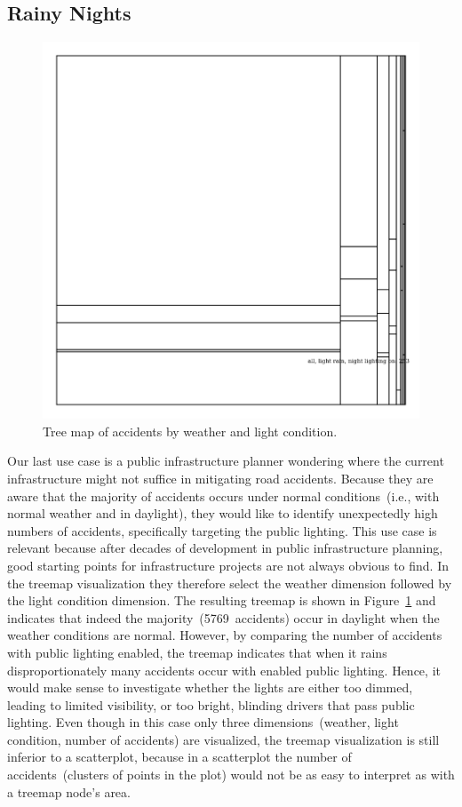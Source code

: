 \subsection{Rainy Nights}
\begin{figure}
    \centering
    \includegraphics[width=0.6\linewidth]{figures/tree-treemap-weather-light-condition}
    \caption{Tree map of accidents by weather and light condition.}
    \label{figure-treemap-weather-light-condition}
\end{figure}
Our last use case is a public infrastructure planner wondering where the current infrastructure might not suffice in mitigating road accidents. Because they are aware that the majority of accidents occurs under normal conditions~(i.e., with normal weather and in daylight), they would like to identify unexpectedly high numbers of accidents, specifically targeting the public lighting.
This use case is relevant because after decades of development in public infrastructure planning, good starting points for infrastructure projects are not always obvious to find. 
In the treemap visualization they therefore select the weather dimension followed by the light condition dimension.
The resulting treemap is shown in Figure~\ref{figure-treemap-weather-light-condition} and indicates that indeed the majority~(5769~accidents) occur in daylight when the weather conditions are normal.
However, by comparing the number of accidents with public lighting enabled, the treemap indicates that when it rains disproportionately many accidents occur with enabled public lighting. Hence, it would make sense to investigate whether the lights are either too dimmed, leading to limited visibility, or too bright, blinding drivers that pass public lighting.
Even though in this case only three dimensions~(weather, light condition, number of accidents) are visualized, the treemap visualization is still inferior to a scatterplot, because in a scatterplot the number of accidents~(clusters of points in the plot) would not be as easy to interpret as with a treemap node's area.
